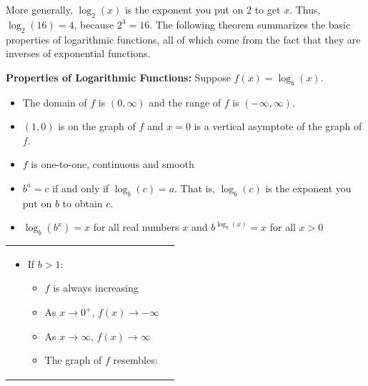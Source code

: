 \smallskip

More generally, $\log_{2}(x)$ is the exponent you put on $2$ to get $x$.  Thus, $\log_{2}(16) = 4$, because $2^{4} = 16$.  The following theorem summarizes the basic properties of logarithmic functions, all of which come from the fact that they are inverses of exponential functions. 
\smallskip

\colorbox{ResultColor}{\bbm

\begin{thm} \label{logfcnprops} \textbf{Properties of Logarithmic Functions:} Suppose $f(x) = \log_{b}(x)$. 

\begin{itemize}

\item  The domain of $f$ is $(0, \infty)$ and the range of $f$ is $(-\infty, \infty)$.

\item  $(1,0)$ is on the graph of $f$ and $x=0$ is a vertical asymptote of the graph of $f$.

\item  $f$ is one-to-one, continuous and smooth

\item  $b^{a} = c$ if and only if $\log_{b}(c) = a$.  That is, $\log_{b}(c)$ is the exponent you put on $b$ to obtain $c$.

\item  $\log_{b} \left(b^{x}\right) = x$ for all real numbers $x$ and $b^{\log_{b}(x)} = x$ for all $x > 0$

\end{itemize}

\begin{tabular}{m{2.5in}m{2.5in}}

\begin{itemize}

\item  If $b > 1$:

\begin{itemize}

\item  $f$ is always increasing

\item  As $x \rightarrow 0^{+}$, $f(x) \rightarrow -\infty$

\item  As $x \rightarrow \infty$, $f(x) \rightarrow \infty$

\item  The graph of $f$ resembles:


\end{itemize}
\end{itemize}
\end{tabular}
\end{thm}}
